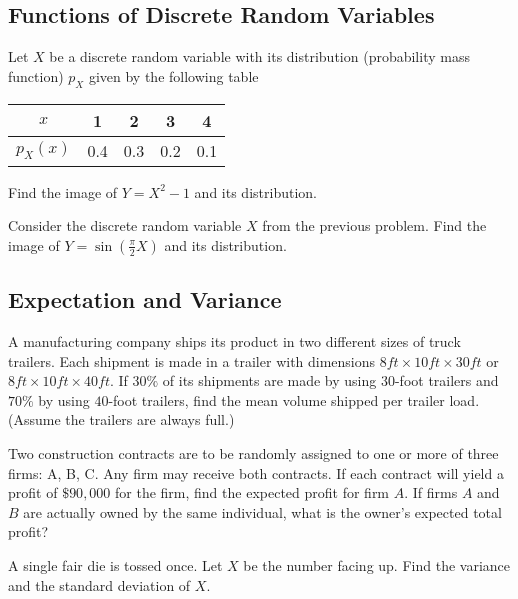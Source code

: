 \subsection{Functions of Discrete Random Variables}
    
    \begin{problem}
    Let $X$ be a discrete random variable with its distribution (probability mass function) $p_X$ given by the following table
        \begin{center}
        \begin{tabular}{c|cccc}
        $x$ & 1 & 2 & 3 & 4 \\\hline
        $p_X (x)$ & 0.4 & 0.3 & 0.2 & 0.1
        \end{tabular}
        \end{center}
    Find the image of $Y = X^2 - 1$ and its distribution. 
    \end{problem}

    \begin{problem}
    Consider the discrete random variable $X$ from the previous problem. Find the image of $Y = \sin (\frac{\pi}{2} X)$ and its distribution.
    \end{problem}

\subsection{Expectation and Variance}

\begin{problem}
A manufacturing company ships its product in two different sizes of truck trailers. Each shipment is made in a trailer with dimensions $8 ft \times 10 ft \times 30 ft$ or $8ft \times 10ft \times 40ft$. If $30\%$ of its shipments are made by using $30$-foot trailers and $70\%$ by using $40$-foot trailers, find the mean volume shipped per trailer load. (Assume the trailers are always full.)
\end{problem}

\begin{problem}
Two construction contracts are to be randomly assigned to one or more of three firms: A, B, C. Any firm may receive both contracts. If each contract will yield a profit of $\$90,000$ for the firm, find the expected profit for firm $A$. If firms $A$ and $B$ are actually owned by the same individual, what is the owner's expected total profit?
\end{problem}

\begin{problem}
A single fair die is tossed once. Let $X$ be the number facing up. Find the variance and the standard deviation of $X$.
\end{problem}


